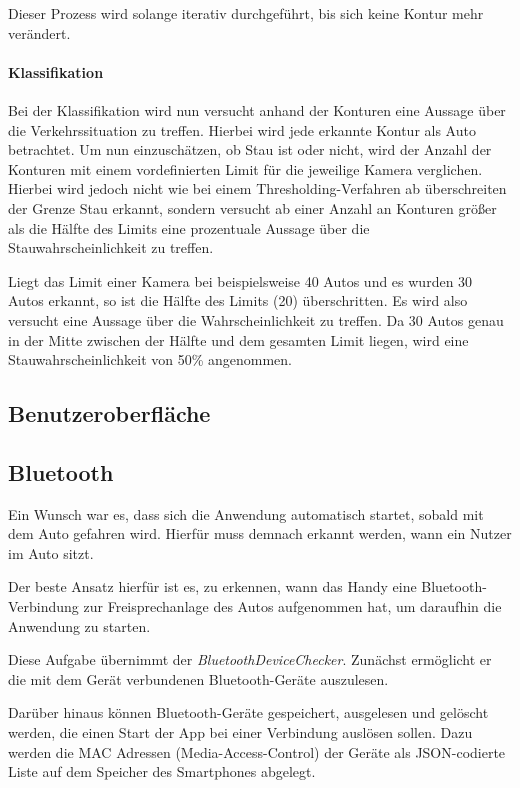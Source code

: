 Dieser Prozess wird solange iterativ durchgeführt, bis sich keine Kontur mehr verändert.

\paragraph*{Klassifikation}
Bei der Klassifikation wird nun versucht anhand der Konturen eine Aussage über die Verkehrssituation zu treffen.
Hierbei wird jede erkannte Kontur als Auto betrachtet.
Um nun einzuschätzen, ob Stau ist oder nicht, wird der Anzahl der Konturen mit einem vordefinierten Limit für die jeweilige Kamera verglichen. Hierbei wird jedoch nicht wie bei einem Thresholding-Verfahren ab überschreiten der Grenze Stau erkannt, sondern versucht ab einer Anzahl an Konturen größer als die Hälfte des Limits eine prozentuale Aussage über die Stauwahrscheinlichkeit zu treffen.

Liegt das Limit einer Kamera bei beispielsweise 40 Autos und es wurden 30 Autos erkannt, so ist die Hälfte des Limits (20) überschritten. Es wird also versucht eine Aussage über die Wahrscheinlichkeit zu treffen. Da 30 Autos genau in der Mitte zwischen der Hälfte und dem gesamten Limit liegen, wird eine Stauwahrscheinlichkeit von 50\% angenommen.

\subsection{Benutzeroberfläche}
\subsection{Bluetooth}
Ein Wunsch war es, dass sich die Anwendung automatisch startet, sobald mit dem Auto gefahren wird.
Hierfür muss demnach erkannt werden, wann ein Nutzer im Auto sitzt.

Der beste Ansatz hierfür ist es, zu erkennen, wann das Handy eine Bluetooth-Verbindung zur Freisprechanlage des Autos aufgenommen hat, um daraufhin die Anwendung zu starten.

Diese Aufgabe übernimmt der {\em BluetoothDeviceChecker}. Zunächst ermöglicht er die mit dem Gerät verbundenen Bluetooth-Geräte auszulesen.

Darüber hinaus können Bluetooth-Geräte gespeichert, ausgelesen und gelöscht werden, die einen Start der App bei einer Verbindung auslösen sollen.
Dazu werden die MAC Adressen (Media-Access-Control) der Geräte als JSON-codierte Liste auf dem Speicher des Smartphones abgelegt.

